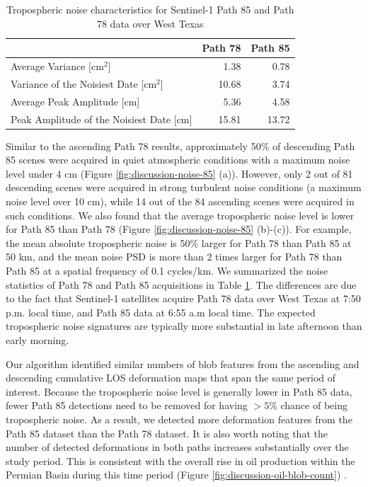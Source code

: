 \begin{table}
	\centering
	\caption{Tropospheric noise characteristics for Sentinel-1 Path 85 and Path 78 data over West Texas}
	\begin{tabular}{lrr}
		\toprule
		{} &  Path 78 &  Path 85 \\
		\midrule
		Average Variance [cm$^2$]             &     1.38 &     0.78 \\
		Variance of the Noisiest Date [cm$^2$] &    10.68 &     3.74 \\
		Average Peak Amplitude [cm]            &     5.36 &     4.58 \\
		Peak Amplitude of the Noisiest Date [cm]         &    15.81 &    13.72 \\
		\bottomrule
	\end{tabular}
	\label{tab:path85-compare}
\end{table}


Similar to the ascending Path 78 results, approximately 50\% of descending Path 85 scenes were acquired in quiet atmospheric conditions with a maximum noise level under 4 cm (Figure \ref{fig:discussion-noise-85} (a)). However, only 2 out of 81 descending scenes were acquired in strong turbulent noise conditions (a maximum noise level over 10 cm), while 14 out of the 84 ascending scenes were acquired in such conditions. We also found that the average tropospheric noise level is lower for Path 85 than Path 78 (Figure \ref{fig:discussion-noise-85} (b)-(c)). For example, the mean absolute tropospheric noise is 50\% larger for Path 78 than Path 85 at 50 km, and the mean noise PSD is more than 2 times larger for Path 78 than Path 85 at a spatial frequency of 0.1 cycles/km. We summarized the noise statistics of Path 78 and Path 85 acquisitions in Table \ref{tab:path85-compare}. The differences are due to the fact that Sentinel-1 satellites acquire Path 78 data over West Texas at 7:50 p.m. local time, and Path 85 data at 6:55 a.m local time. The expected tropospheric noise signatures are typically more substantial in late afternoon than early morning.



Our algorithm identified similar numbers of blob features from the ascending and descending cumulative LOS deformation maps that span the same period of interest. Because the tropospheric noise level is generally lower in Path 85 data, fewer Path 85 detections need to be removed for having $>5\%$ chance of being tropospheric noise. As a result, we detected more deformation features from the Path 85 dataset than the Path 78 dataset. It is also worth noting that the number of detected deformations in both paths increases substantially over the study period. This is consistent with the overall rise in oil production within the Permian Basin during this time period (Figure \ref{fig:discussion-oil-blob-count}) .



